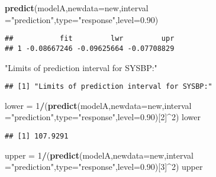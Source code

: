 \documentclass[]{article}
\newenvironment{Shaded}{\begin{snugshade}}{\end{snugshade}}
\newcommand{\KeywordTok}[1]{\textcolor[rgb]{0.13,0.29,0.53}{\textbf{#1}}}
\newcommand{\DataTypeTok}[1]{\textcolor[rgb]{0.13,0.29,0.53}{#1}}
\newcommand{\DecValTok}[1]{\textcolor[rgb]{0.00,0.00,0.81}{#1}}
\newcommand{\FloatTok}[1]{\textcolor[rgb]{0.00,0.00,0.81}{#1}}
\newcommand{\StringTok}[1]{\textcolor[rgb]{0.31,0.60,0.02}{#1}}
\newcommand{\OperatorTok}[1]{\textcolor[rgb]{0.81,0.36,0.00}{\textbf{#1}}}
\newcommand{\NormalTok}[1]{#1}
\begin{document}
\begin{Shaded}
\begin{Highlighting}[]
\KeywordTok{predict}\NormalTok{(modelA,}\DataTypeTok{newdata=}\NormalTok{new,}\DataTypeTok{interval =}\StringTok{"prediction"}\NormalTok{,}\DataTypeTok{type=}\StringTok{"response"}\NormalTok{,}\DataTypeTok{level=}\FloatTok{0.90}\NormalTok{)}
\end{Highlighting}
\end{Shaded}

\begin{verbatim}
##           fit         lwr         upr
## 1 -0.08667246 -0.09625664 -0.07708829
\end{verbatim}

\begin{Shaded}
\begin{Highlighting}[]
\StringTok{"Limits of prediction interval for SYSBP:"}
\end{Highlighting}
\end{Shaded}

\begin{verbatim}
## [1] "Limits of prediction interval for SYSBP:"
\end{verbatim}

\begin{Shaded}
\begin{Highlighting}[]
\NormalTok{lower =}\StringTok{ }\DecValTok{1}\OperatorTok{/}\NormalTok{(}\KeywordTok{predict}\NormalTok{(modelA,}\DataTypeTok{newdata=}\NormalTok{new,}\DataTypeTok{interval =}\StringTok{"prediction"}\NormalTok{,}\DataTypeTok{type=}\StringTok{"response"}\NormalTok{,}\DataTypeTok{level=}\FloatTok{0.90}\NormalTok{)[}\DecValTok{2}\NormalTok{]}\OperatorTok{^}\DecValTok{2}\NormalTok{)}
\NormalTok{lower}
\end{Highlighting}
\end{Shaded}

\begin{verbatim}
## [1] 107.9291
\end{verbatim}

\begin{Shaded}
\begin{Highlighting}[]
\NormalTok{upper =}\StringTok{ }\DecValTok{1}\OperatorTok{/}\NormalTok{(}\KeywordTok{predict}\NormalTok{(modelA,}\DataTypeTok{newdata=}\NormalTok{new,}\DataTypeTok{interval =}\StringTok{"prediction"}\NormalTok{,}\DataTypeTok{type=}\StringTok{"response"}\NormalTok{,}\DataTypeTok{level=}\FloatTok{0.90}\NormalTok{)[}\DecValTok{3}\NormalTok{]}\OperatorTok{^}\DecValTok{2}\NormalTok{)}
\NormalTok{upper}
\end{Highlighting}
\end{Shaded}
\end{document}
